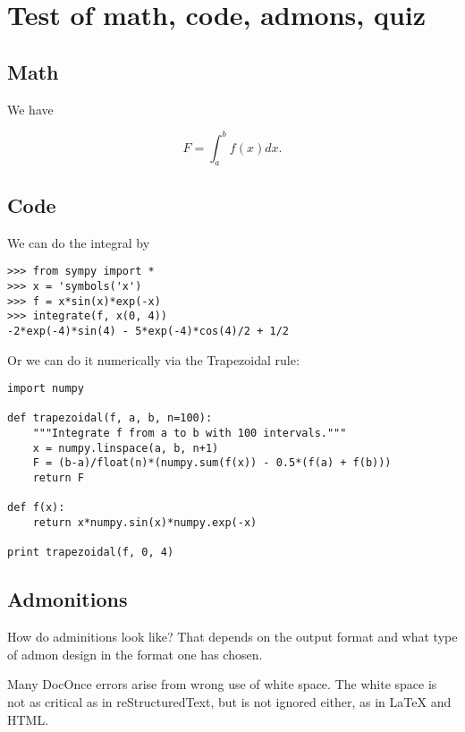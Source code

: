 \documentclass[%
oneside,                 %
final,                   %
10pt]{article}
\newenvironment{warning_mdfboxadmon}[1][]{
\begin{warning_mdfboxmdframed}[frametitle=#1]
}
{
\end{warning_mdfboxmdframed}
}
\newenvironment{question_mdfboxadmon}[1][]{
\begin{question_mdfboxmdframed}[frametitle=#1]
}
{
\end{question_mdfboxmdframed}
}
\begin{document}
\section{Test of math, code, admons, quiz}

\subsection{Math}

We have

\begin{equation}
F = \int_a^b f(x)dx.
\end{equation}

\subsection{Code}

We can do the integral by

\begin{Verbatim}[numbers=none,fontsize=\fontsize{9pt}{9pt},baselinestretch=0.95,xleftmargin=2mm]
>>> from sympy import *
>>> x = 'symbols('x')
>>> f = x*sin(x)*exp(-x)
>>> integrate(f, x(0, 4))
-2*exp(-4)*sin(4) - 5*exp(-4)*cos(4)/2 + 1/2
\end{Verbatim}

Or we can do it numerically via the Trapezoidal rule:

\begin{Verbatim}[numbers=none,fontsize=\fontsize{9pt}{9pt},baselinestretch=0.95,xleftmargin=2mm]
import numpy

def trapezoidal(f, a, b, n=100):
    """Integrate f from a to b with 100 intervals."""
    x = numpy.linspace(a, b, n+1)
    F = (b-a)/float(n)*(numpy.sum(f(x)) - 0.5*(f(a) + f(b)))
    return F

def f(x):
    return x*numpy.sin(x)*numpy.exp(-x)

print trapezoidal(f, 0, 4)
\end{Verbatim}

\subsection{Admonitions}


\begin{question_mdfboxadmon}[Question.]
How do adminitions look like? That depends on the output format and
what type of admon design in the format one has chosen.
\end{question_mdfboxadmon} %




\begin{warning_mdfboxadmon}
Many DocOnce errors arise from wrong use of white space. The white space
is not as critical as in reStructuredText, but is not ignored either,
as in {\LaTeX} and HTML.
\end{warning_mdfboxadmon} %




\end{document}
